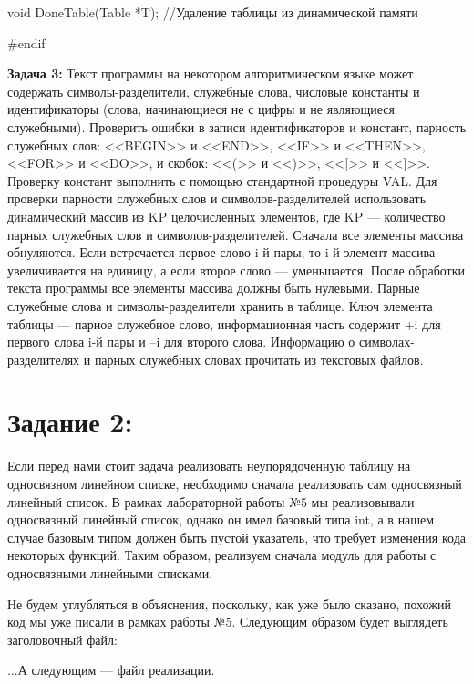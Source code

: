 \documentclass[12pt]{article}
\begin{document}
{{	void DoneTable(Table *T); //Удаление таблицы из динамической памяти 
	
	\#endif}
	
	{\bf Задача 3:} Текст программы на некотором алгоритмическом языке может содержать символы-разделители, служебные слова, числовые константы и идентификаторы (слова, начинающиеся не с цифры и не являющиеся служебными). Проверить ошибки в записи идентификаторов и констант, парность служебных слов: <<BEGIN>> и <<END>>, <<IF>> и <<THEN>>, <<FOR>> и <<DO>>, и скобок: <<(>> и <<)>>, <<[>> и <<]>>. Проверку констант выполнить с помощью стандартной процедуры VAL. Для проверки парности служебных слов и символов-разделителей использовать динамический массив из KP целочисленных элементов, где KP — количество парных служебных слов и символов-разделителей. Сначала все элементы массива обнуляются. Если встречается первое слово i-й пары, то i-й элемент массива увеличивается на единицу, а если второе слово — уменьшается. После обработки текста программы все элементы массива должны быть нулевыми. Парные служебные слова  и  символы-разделители  хранить  в  таблице.  Ключ  элемента  таблицы — парное служебное слово, информационная часть содержит +i для первого слова i-й пары и –i для второго слова. Информацию о символах-разделителях и парных служебных словах прочитать из текстовых файлов.
	
	\section{Задание 2:}
	\label{task_2}
	
	Если перед нами стоит задача реализовать неупорядоченную таблицу на односвязном линейном списке, необходимо сначала реализовать сам односвязный линейный список. В рамках лабораторной работы №5 мы реализовывали односвязный линейный список, однако он имел базовый типа int, а в нашем случае базовым типом должен быть пустой указатель, что требует изменения кода некоторых функций. Таким образом, реализуем сначала модуль для работы с односвязными линейными списками.
	
	Не будем углубляться в объяснения, поскольку, как уже было сказано, похожий код мы уже писали в рамках работы №5. Следующим образом будет выглядеть заголовочный файл:
	
	
	
	...А следующим --- файл реализации. 
	
	 
			
}
\end{document}
